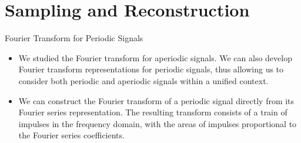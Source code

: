 \section{Sampling and Reconstruction}
\begin{frame}{Fourier Transform for Periodic Signals}
    \begin{itemize}
      \item We studied the Fourier transform for aperiodic signals. We can also develop Fourier transform representations for periodic signals, thus allowing us to consider both periodic and aperiodic signals within a unified context.
      \item We can construct the Fourier transform of a periodic signal directly from its Fourier series representation. The resulting transform consists of a train of impulses in the frequency domain, with the areas of impulses proportional to the Fourier series coefficients.
    \end{itemize}
\end{frame}


